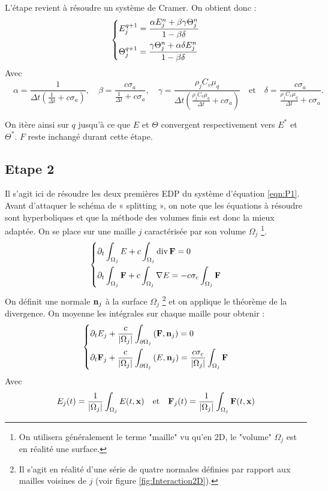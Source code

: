 L'étape revient à résoudre un système de Cramer. On obtient donc :
\begin{equation} 
    \begin{dcases}
     E_j^{q+1} = \dfrac{\alpha E_j^n + \beta \gamma \Theta_j^n}{1 - \beta \delta} \\
     \Theta_j^{q+1} = \dfrac{\gamma \Theta_j^n + \alpha \delta E_j^n}{1 - \beta \delta} 
    \end{dcases}
\label{eqn:Step1}
\end{equation}
Avec $\quad  \alpha = \dfrac{1}{\Delta t \left( \frac{1}{\Delta t} + c \sigma_a \right)} ,\quad 
\beta = \dfrac{c \sigma_a}{\frac{1}{\Delta t} + c \sigma_a} ,\quad 
\gamma = \dfrac{\rho_j C_v \mu_q}{\Delta t \left( \frac{\rho_j C_v \mu_q}{\Delta t} + c \sigma_a \right)} \quad \text{et} \quad  
\delta = \dfrac{c \sigma_a}{\frac{\rho_j C_v \mu_q}{\Delta t} + c \sigma_a}.$

On itère ainsi sur $q$ jusqu'à ce que $E$ et $\Theta$ convergent respectivement vers $E^*$ et $\Theta^*$. $F$ reste inchangé durant cette étape.

\subsection{Etape 2}
Il s'agit ici de résoudre les deux premières EDP du système d'équation \ref{eqn:P1}. Avant d'attaquer le schéma de « splitting », on note que les équations à résoudre sont hyperboliques et que la méthode des volumes finis est donc la mieux adaptée. On se place sur une maille $j$ caractérisée par son volume $\Omega_j$ \footnote{On utilisera généralement le terme "maille" vu qu'en 2D, le "volume" $\Omega_j$ est en réalité une surface.}.
\begin{equation*} 
    \begin{dcases}
    \partial_t \int_{\Omega_j} E + c \int_{\Omega_j} \operatorname{div} \mathbf{F}  = 0\\
    \partial_t \int_{\Omega_j} \mathbf{F} + c \int_{\Omega_j} \nabla E = -c \sigma_c \int_{\Omega_j} \mathbf{F} 
    \end{dcases}   
\end{equation*}
On définit une normale $\mathbf{n}_j$ à la surface $\Omega_j$ \footnote{Il s'agit en réalité d'une série de quatre normales définies par rapport aux mailles voisines de $j$ (voir figure \ref{fig:Interaction2D}).} et on applique le théorème de la divergence. On moyenne les intégrales sur chaque maille pour obtenir :
\begin{equation} 
    \begin{dcases}
    \partial_t E_j + \frac{c}{\left|\Omega_j\right|} \int_{\partial\Omega_j} \left( \mathbf{F}, \mathbf{n}_j  \right) = 0\\
    \partial_t \mathbf{F}_j + \frac{c}{\left|\Omega_j\right|} \int_{\partial\Omega_j} \left( E, \mathbf{n}_j  \right)= \frac{c \sigma_c}{\left|\Omega_j\right|} \int_{\Omega_j} \mathbf{F}
    \end{dcases}   
\label{eqn:VolFin}
\end{equation}
Avec $$ E_j(t) = \frac{1}{\left|\Omega_j\right|} \int_{\Omega_j} E(t,\mathbf{x}) \quad \text{et} \quad \mathbf{F}_j(t) = \frac{1}{\left|\Omega_j\right|} \int_{\Omega_j} \mathbf{F}(t,\mathbf{x}) $$

